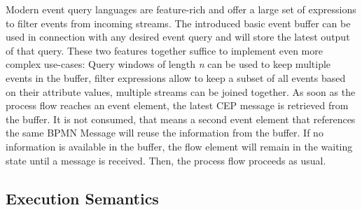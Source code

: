 Modern event query languages are feature-rich and offer a large set of expressions to filter events from incoming streams. 
The introduced basic event buffer can be used in connection with any desired event query and will store the latest output of that query.
These two features together suffice to implement even more complex use-cases: Query windows of length \textit{n} can be used to keep multiple events in the buffer, filter expressions allow to keep a subset of all events based on their attribute values, multiple streams can be joined together.
As soon as the process flow reaches an event element, the latest CEP message is retrieved from the buffer. It is not consumed, that means a second event element that references the same BPMN Message will reuse the information from the buffer.
If no information is available in the buffer, the flow element will remain in the waiting state until a message is received. Then, the process flow proceeds as usual.

\subsection{Execution Semantics}
